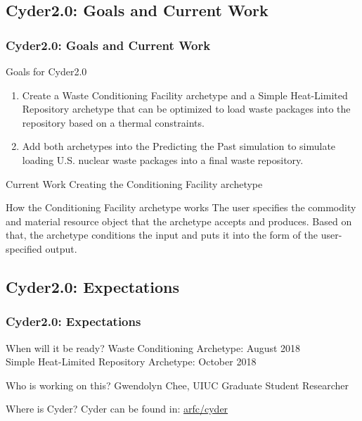 \subsection{Cyder2.0: Goals and Current Work}
\begin{frame}
  \frametitle{Cyder2.0: Goals and Current Work}

\begin{block}{Goals for Cyder2.0}
\begin{enumerate}
	\item Create a Waste Conditioning Facility archetype and a Simple Heat-Limited Repository archetype that can be optimized to load waste packages into the repository based on a thermal constraints. 
	\item Add both archetypes into the Predicting the Past \Cyclus simulation to simulate loading U.S. nuclear waste packages into a final waste repository. 
\end{enumerate}
\end{block}

\begin{block}{Current Work}
	Creating the Conditioning Facility archetype
\end{block}

\begin{block}{How the Conditioning Facility archetype works}
The user specifies the commodity and material resource object that the archetype accepts and produces. Based on that, the archetype conditions the input and puts it into the form of the user-specified output.
\end{block}

\end{frame}

\subsection{Cyder2.0: Expectations}

\begin{frame}
\frametitle{Cyder2.0: Expectations}

\begin{block}{When will it be ready?}
	Waste Conditioning Archetype: August 2018 \\
	Simple Heat-Limited Repository Archetype: October 2018 
\end{block}

\begin{block}{Who is working on this?}
	Gwendolyn Chee, UIUC Graduate Student Researcher
\end{block}

\begin{block}{Where is Cyder?}
	Cyder can be found in: \href{https://github.com/arfc/cyder}{arfc/cyder} 
\end{block}

\end{frame}